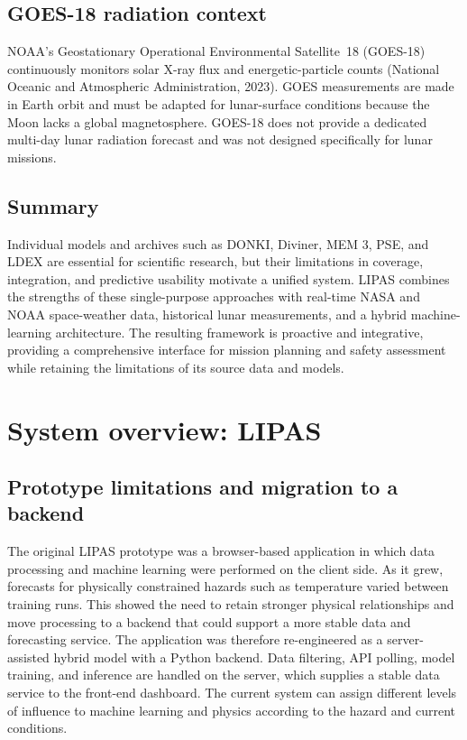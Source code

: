 \subsection{GOES-18 radiation context}

NOAA's Geostationary Operational Environmental Satellite~18 (GOES-18) continuously monitors solar X-ray flux and energetic-particle counts (National Oceanic and Atmospheric Administration, 2023). GOES measurements are made in Earth orbit and must be adapted for lunar-surface conditions because the Moon lacks a global magnetosphere. GOES-18 does not provide a dedicated multi-day lunar radiation forecast and was not designed specifically for lunar missions.

\subsection{Summary}

Individual models and archives such as DONKI, Diviner, MEM 3, PSE, and LDEX are essential for scientific research, but their limitations in coverage, integration, and predictive usability motivate a unified system. LIPAS combines the strengths of these single-purpose approaches with real-time NASA and NOAA space-weather data, historical lunar measurements, and a hybrid machine-learning architecture. The resulting framework is proactive and integrative, providing a comprehensive interface for mission planning and safety assessment while retaining the limitations of its source data and models.

\section{System overview: LIPAS}

\subsection{Prototype limitations and migration to a backend}

The original LIPAS prototype was a browser-based application in which data processing and machine learning were performed on the client side. As it grew, forecasts for physically constrained hazards such as temperature varied between training runs. This showed the need to retain stronger physical relationships and move processing to a backend that could support a more stable data and forecasting service. The application was therefore re-engineered as a server-assisted hybrid model with a Python backend. Data filtering, API polling, model training, and inference are handled on the server, which supplies a stable data service to the front-end dashboard. The current system can assign different levels of influence to machine learning and physics according to the hazard and current conditions.

